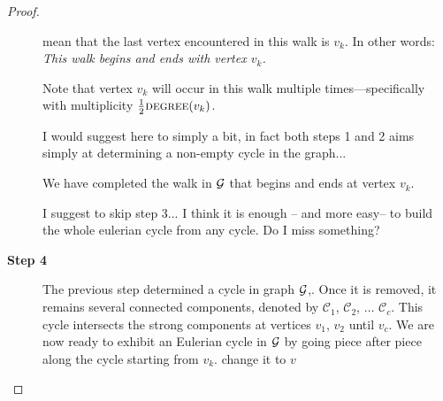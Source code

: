 \begin{proof}
\begin{description}
\noindent
mean that the last vertex encountered in this walk is $v_k$.  In other
words: {\em This walk begins and ends with vertex $v_k$.}

{\Arny
\noindent {}

\noindent {}
}


Note that vertex $v_k$ will occur in this walk multiple
times---specifically with multiplicity $\frac{1}{2} \mbox{\sc
  degree}(v_k)$.
  
{\Denis I would suggest here to simply a bit, in fact both  steps 1 and 2 aims simply at determining a non-empty cycle in the graph...}

We have completed the walk in $\mbox{$\cal G$}$ that begins and ends at vertex $v_k$.

{\Denis I suggest to skip step 3... I think it is enough -- and more easy-- to build
the whole eulerian cycle from any cycle. Do I miss something?}


\item[{\bf Step 4}]

The previous step determined a cycle in graph $\mbox{$\cal G$}$,.
Once it is removed, it remains several connected components,
denoted by $\mathcal{C}_1$, $\mathcal{C}_2$, $\ldots$ $\mathcal{C}_c$.
This cycle intersects the strong components at vertices $v_1$, $v_2$ until $v_c$. 
We are now ready to exhibit an Eulerian cycle in $\mbox{$\cal G$}$ by going piece after piece along the cycle 
starting from $v_k$.
{\Denis change it to $v$}


\end{description}
\end{proof}
